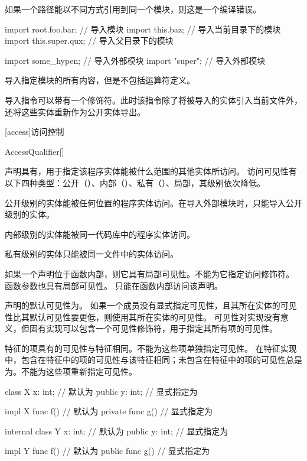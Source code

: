 \pnum
如果一个路径能以不同方式引用到同一个模块，则这是一个编译错误。

\enterexample
\begin{codeblock}
import root.foo.bar; // 导入模块
import this.baz; // 导入当前目录下的模块
import this.super.qux; // 导入父目录下的模块

import some_hypen; // 导入外部模块
import "super"; // 导入外部模块
\end{codeblock}
\exitexample

\pnum
\tcode{*}导入指定模块的所有内容，但是不包括运算符定义。

\pnum
导入指令可以带有一个修饰符。此时该指令除了将被导入的实体引入当前文件外，还将这些实体重新作为公开实体导出。

[access]{访问控制}

\begin{bnf}{AccessQualifier}[\oneof]
\end{bnf}

\pnum
声明具有，用于指定该程序实体能被什么范围的其他实体所访问。
访问可见性有以下四种类型：公开（）、内部（）、私有（）、局部，其级别依次降低。

\pnum
公开级别的实体能被任何位置的程序实体访问。在导入外部模块时，只能导入公开级别的实体。

\pnum
内部级别的实体能被同一代码库中的程序实体访问。

\pnum
私有级别的实体只能被同一文件中的实体访问。

\pnum
如果一个声明位于函数内部，则它具有局部可见性。不能为它指定访问修饰符。
函数参数也具有局部可见性。
只能在函数内部访问该声明。

\pnum
声明的默认可见性为。
如果一个成员没有显式指定可见性，且其所在实体的可见性比其默认可见性要更低，则使用其所在实体的可见性。
可见性对实现没有意义，但固有实现可以包含一个可见性修饰符，用于指定其所有项的可见性。

\pnum
特征的项具有的可见性与特征相同。不能为这些项单独指定可见性。
在特征实现中，包含在特征中的项的可见性与该特征相同；未包含在特征中的项的可见性总是为。不能为这些项重新指定可见性。

\enterexample
\begin{codeblock}
class X {
    x: int; // 默认为
    public y: int; // 显式指定为
}

impl X {
    func f() {} // 默认为
    private func g() {} // 显式指定为
}

internal class Y {
    x: int; // 默认为
    public y: int; // 显式指定为
}

impl Y {
    func f() {} // 默认为
    public func g() {} // 显式指定为
}
\end{codeblock}